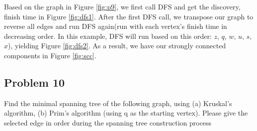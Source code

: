 \documentclass[a4paper]{article}
\makeatletter
\newenvironment{solution}
  {\begin{proof}[Solution]}
  {\end{proof}}
\renewenvironment{proof}[1][\proofname]{%
  \par\pushQED{\qed}\normalfont%
  \topsep6\p@\@plus6\p@\relax
  \trivlist\item[\hskip\labelsep\bfseries#1\@addpunct{.}]%
  \ignorespaces
}{%
  \popQED\endtrivlist\@endpefalse
}
\makeatother
\begin{document}
\begin{solution}
  Based on the graph in Figure \ref{fig:p9}, we first call DFS and get the discovery, finish time in Figure \ref{fig:dfs1}. After the first DFS call, we transpose our graph to reverse all edges and run DFS again(run with each vertex's finish time in decreasing order. In this example, DFS will run based on this order: $z$, $q$, $w$, $u$, $s$, $x$), yielding Figure \ref{fig:dfs2}. As a result, we have our strongly connected components in Figure \ref{fig:scc}.
\end{solution}

\newpage
\subsection*{Problem 10}
Find the minimal spanning tree of the following graph, using (a) Kruskal’s algorithm, (b) Prim’s algorithm (using q as the starting vertex). Please give the selected edge in order during the spanning tree construction process
\end{document}
